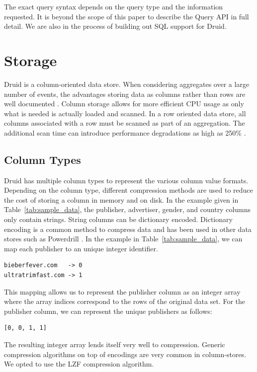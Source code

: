 \documentclass{vldb}
\begin{document}
The exact query syntax depends on the query type and the information requested.
It is beyond the scope of this paper to describe the Query API in full detail.
We are also in the process of building out SQL support for Druid.

\section{Storage}
\label{sec:storage}
Druid is a column-oriented data store. When considering aggregates
over a large number of events, the advantages storing data as columns
rather than rows are well documented \cite{cattell2011scalable}. Column storage allows for
more efficient CPU usage as only what is needed is actually loaded and
scanned. In a row oriented data store, all columns associated with a
row must be scanned as part of an aggregation. The additional scan
time can introduce performance degradations as high as 250\% \cite{bear2012vertica}.

\subsection{Column Types}
Druid has multiple column types to represent the various column value
formats. Depending on the column type, different compression methods
are used to reduce the cost of storing a column in memory and on
disk. In the example given in Table~\ref{tab:sample_data}, the
publisher, advertiser, gender, and country columns only contain
strings. String columns can be dictionary encoded. Dictionary encoding
is a common method to compress data and has been used in other data
stores such as Powerdrill \cite{hall2012processing}. In the example in
Table~\ref{tab:sample_data}, we can map each publisher to an unique
integer identifier.
\begin{verbatim}
bieberfever.com   -> 0
ultratrimfast.com -> 1
\end{verbatim}
This mapping allows us to represent the publisher column as an integer
array where the array indices correspond to the rows of the original
data set. For the publisher column, we can represent the unique
publishers as follows:
\begin{verbatim}
[0, 0, 1, 1]
\end{verbatim}

The resulting integer array lends itself very well to
compression. Generic compression algorithms on top of encodings are
very common in column-stores. We opted to use the LZF \cite{liblzf2013} compression
algorithm.
\end{document}
